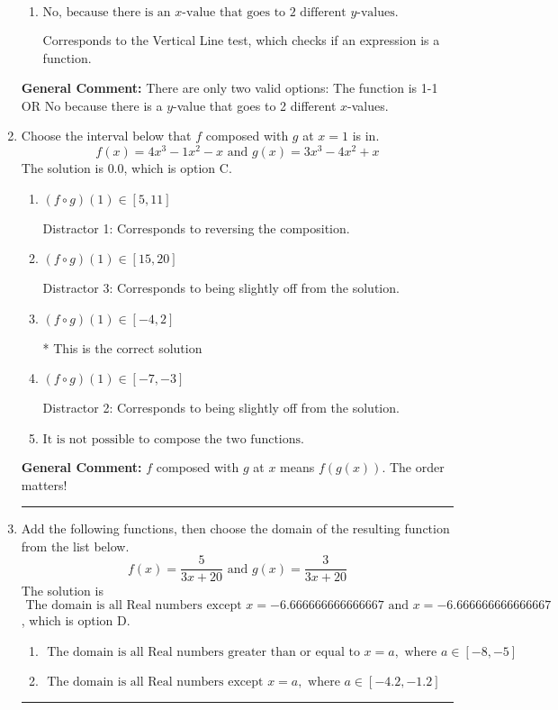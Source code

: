 \documentclass{extbook}[14pt]
\newcommand{\litem}[1]{\item #1

\rule{\textwidth}{0.4pt}}
\begin{document}
\begin{enumerate}
{\begin{enumerate}[label=\Alph*.]
Corresponds to believing 1-1 means the range is all Real numbers.
\item \( \text{No, because there is an $x$-value that goes to 2 different $y$-values.} \)

Corresponds to the Vertical Line test, which checks if an expression is a function.
\end{enumerate}

\textbf{General Comment:} There are only two valid options: The function is 1-1 OR No because there is a $y$-value that goes to 2 different $x$-values.
}
\litem{
Choose the interval below that $f$ composed with $g$ at $x=1$ is in.
\[ f(x) = 4x^{3} -1 x^{2} -x \text{ and } g(x) = 3x^{3} -4 x^{2} +x \]The solution is \( 0.0 \), which is option C.\begin{enumerate}[label=\Alph*.]
\item \( (f \circ g)(1) \in [5, 11] \)

 Distractor 1: Corresponds to reversing the composition.
\item \( (f \circ g)(1) \in [15, 20] \)

 Distractor 3: Corresponds to being slightly off from the solution.
\item \( (f \circ g)(1) \in [-4, 2] \)

* This is the correct solution
\item \( (f \circ g)(1) \in [-7, -3] \)

 Distractor 2: Corresponds to being slightly off from the solution.
\item \( \text{It is not possible to compose the two functions.} \)


\end{enumerate}

\textbf{General Comment:} $f$ composed with $g$ at $x$ means $f(g(x))$. The order matters!
}
\litem{
Add the following functions, then choose the domain of the resulting function from the list below.
\[ f(x) = \frac{5}{3x+20} \text{ and } g(x) = \frac{3}{3x+20} \]The solution is \( \text{ The domain is all Real numbers except } x = -6.666666666666667 \text{ and } x = -6.666666666666667 \), which is option D.\begin{enumerate}[label=\Alph*.]
\item \( \text{ The domain is all Real numbers greater than or equal to } x = a, \text{ where } a \in [-8, -5] \)


\item \( \text{ The domain is all Real numbers except } x = a, \text{ where } a \in [-4.2, -1.2] \)



\end{enumerate}}
\end{enumerate}
\end{document}
